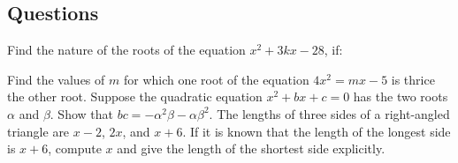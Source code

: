 \subsection*{Questions}
\begin{questions}
  \question Find the nature of the roots of the equation $ x^2 + 3kx - 28 $, if:
  \question Find the values of $ m $ for which one root of the equation $ 4x^2 = mx - 5 $ is thrice the other root.
  \question Suppose the quadratic equation $ x^2 + bx + c = 0 $ has the two roots $ \alpha $ and $ \beta $. Show
            that $ bc = -\alpha^2\beta - \alpha\beta^2 $.
  \question The lengths of three sides of a right-angled triangle are $ x - 2 $, $ 2x $, and $ x + 6 $. If it is
            known that the length of the longest side is $ x + 6 $, compute $ x $ and give the length of the shortest
            side explicitly.
\end{questions}



